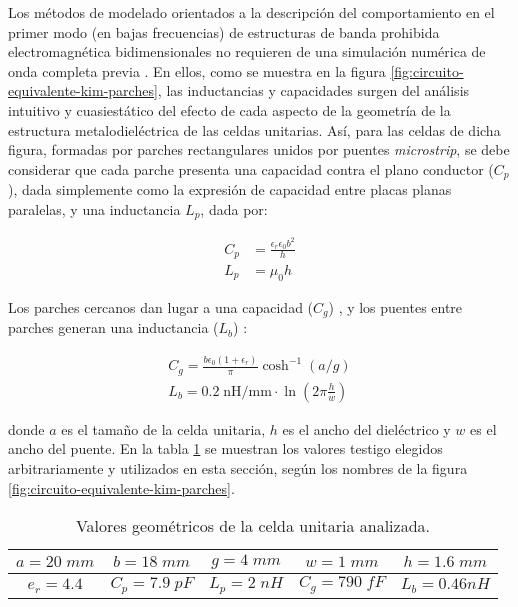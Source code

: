 Los métodos de modelado orientados a la descripción del comportamiento en el primer modo (en bajas frecuencias) de estructuras de banda prohibida electromagnética bidimensionales no requieren de una simulación numérica de onda completa previa \cite{KimSchuttAine:AnalysisHybrid}. En ellos, como se muestra en la figura \ref{fig:circuito-equivalente-kim-parches}, las inductancias y capacidades surgen del análisis intuitivo y cuasiestático del efecto de cada aspecto de la geometría de la estructura metalodieléctrica de las celdas unitarias. Así, para las celdas de dicha figura, formadas por parches rectangulares unidos por puentes \textit{microstrip}, se debe considerar que cada parche presenta una capacidad contra el plano conductor ($C_p$), dada simplemente como la expresión de capacidad entre placas planas paralelas, y una inductancia $L_p$, dada por:

\begin{align}
\label{eq:Cp_Lp}
C_p &= \frac{\epsilon_r \epsilon_0 b^2}{h} \\
L_p &= \mu_0 h
\end{align}

Los parches cercanos dan lugar a una capacidad ($C_g$) \cite{Marcela:Tesis} \cite{Sievenpiper:Thesis} \cite{KimSchuttAine:AnalysisHybrid}, y los puentes entre parches generan una inductancia ($L_{b}$) \cite{KimSchuttAine:AnalysisHybrid}:

\begin{align}
\label{eq:cgap-y-lgap}
C_{g} = \frac{b \epsilon_0 (1+\epsilon_r)}{\pi} \cosh^{-1} (a / g) \\
L_{b} = 0.2\; \text{nH/mm} \cdot \ln (2\pi \frac{h}{w})
\end{align}

donde $a$ es el tamaño de la celda unitaria, $h$ es el ancho del dieléctrico y $w$ es el ancho del puente. En la tabla \ref{table:CeldaUnitariaFacil-AnalisisiCircuital} se muestran los valores testigo elegidos arbitrariamente y utilizados en esta sección, según los nombres de la figura \ref{fig:circuito-equivalente-kim-parches}.

\begin{table}
	\centering
	\begin{tabular}{|c|c|c|c|c|}
		
		\hline
		$a = 20\;mm$ & $b = 18 \;mm$ & $g = 4 \;mm$ & $w = 1\;mm$ & $h = 1.6\;mm$ \\ 
		\hline
		$e_r = 4.4$ & $C_p = 7.9\;pF$ & $L_p = 2\;nH$ & $C_g = 790\; fF$ & $L_b = 0.46 nH$ \\ 
		\hline 
	\end{tabular}
	\caption{Valores geométricos de la celda unitaria analizada.}
	\label{table:CeldaUnitariaFacil-AnalisisiCircuital}
\end{table}



